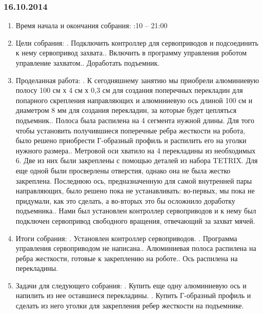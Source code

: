 \documentclass[12pt]{article}
\begin{document}
	      \subsubsection{16.10.2014}
	      \begin{enumerate}
	      	\item Время начала и окончания собрания:
	      	:10 – 21:00
	      	\item Цели собрания:
	      	.	Подключить контроллер для сервоприводов и подсоединить к нему сервопривод захвата..	Включить в программу управления роботом управление захватом..	Доработать подъемник.
	      	
	      	\item Проделанная работа:
	      	.	К сегодняшнему занятию мы приобрели алюминиевую полосу 100 см х 4 см х 0,3 см для создания поперечных перекладин для попарного скрепления направляющих и алюминиевую ось длиной 100 см и диаметром 8 мм для создания перекладин, за которые будет цепляться подъемник..	Полоса была распилена на 4 сегмента нужной длины. Для того чтобы установить получившиеся поперечные ребра жесткости на робота, было решено приобрести Г-образный профиль и распилить его на уголки нужного размера..	Метровой оси хватило на 4 перекладины из необходимых 6. Две из них были закреплены с помощью деталей из набора TETRIX. Для еще одной были просверлены отверстия, однако она не была жестко закреплена. Последнюю ось, предназначенную для самой внутренней пары направляющих, было решено пока не устанавливать: во-первых, мы пока не придумали, как это сделать, а во-вторых это бы осложнило доработку подъемника..	Нами был установлен контроллер сервоприводов и к нему был подключен сервопривод свободного вращения, отвечающий за захват мячей.\newline

	      	\item Итоги собрания:
	      	.	Установлен контроллер сервоприводов.
	      	.	Программа управления сервоприводом не написана..	Алюминиевая полоса распилена на ребра жесткости, готовые к закреплению на роботе..	Ось распилена на перекладины.
	      	
	      	\item Задачи для следующего собрания:
	      	.	Купить еще одну алюминиевую ось и напилить из нее оставшиеся перекладины.
	      	.	Купить Г-образный профиль и сделать из него уголки для закрепления ребер жесткости на подъемнике.
	      \end{enumerate}
	      \newpage
\end{document}
